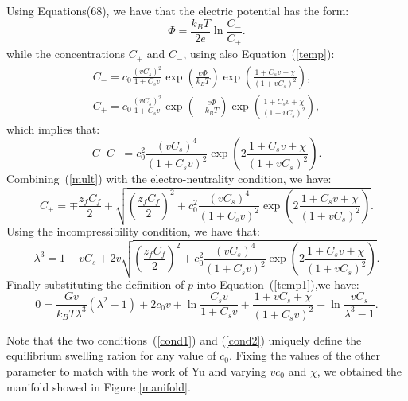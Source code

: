 Using Equations(68), we have that the electric potential has the form:
\begin{equation}
\Phi= \frac{k_BT}{2e}\ln\frac{C_-}{C_+}.
\end{equation}
while the concentrations $C_+$ and $C_-$, using also Equation~(\ref{temp}):
\begin{gather}
C_- = c_0 \frac{(v C_s)^2}{1+C_sv} \exp\left(\frac{e\Phi}{k_BT}\right) \exp\left(\frac{1+C_sv+\chi}{(1+vC_s)^2}\right),\\
C_+ = c_0 \frac{(v C_s)^2}{1+C_sv} \exp\left(-\frac{e\Phi}{k_BT}\right) \exp\left(\frac{1+C_sv+\chi}{(1+vC_s)^2}\right),
\end{gather}
which implies that:
\begin{equation}
C_+C_-= c^2_0\frac{(v C_s)^4}{(1+C_sv)^2} \exp\left(2\frac{1+C_sv+\chi}{(1+vC_s)^2}\right).\label{mult}
\end{equation}
Combining~(\ref{mult}) with the electro-neutrality condition, we have:
\begin{equation}
C_\pm = \mp \frac{z_fC_f}{2} + \sqrt{\left( \frac{z_fC_f}{2} \right)^2 + c^2_0\frac{(v C_s)^4}{(1+C_sv)^2} \exp\left(2\frac{1+C_sv+\chi}{(1+vC_s)^2}\right)}.
\end{equation}
Using the incompressibility condition, we have that:
\begin{equation}
\lambda^3=1+vC_s + 2v  \sqrt{\left( \frac{z_fC_f}{2} \right)^2 + c^2_0\frac{(v C_s)^4}{(1+C_sv)^2} \exp\left(2\frac{1+C_sv+\chi}{(1+vC_s)^2}\right)}\label{cond1}.
\end{equation}
Finally substituting the definition of $p$ into Equation~(\ref{temp1}),we have:
\begin{equation}
0=\frac{Gv}{k_BT\lambda^3}(\lambda^2-1) + 2c_0v + \ln \frac{C_sv}{1+C_sv} + \frac{1+vC_s+\chi}{(1+C_sv)^2} + \ln \frac{vC_s}{\lambda^3-1}.\label{cond2}
\end{equation}

Note that the two conditions~(\ref{cond1}) and (\ref{cond2}) uniquely define the equilibrium swelling ration for any value of $c_0$. Fixing the values of the other parameter to match with the work of Yu and varying $vc_0$ and $\chi$, we obtained the manifold showed in Figure \ref{manifold}.

